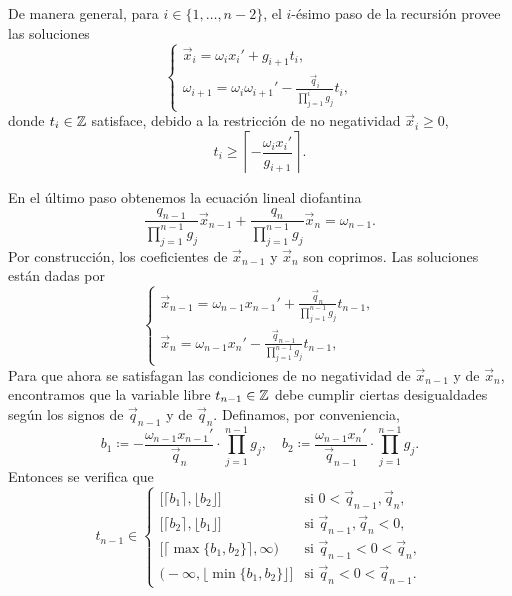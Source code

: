 De manera general, para $i \in \lbrace 1, \ldots, n - 2 \rbrace$, el $i$-ésimo paso de la recursión
provee las soluciones
\begin{equation}
	\label{eq:recurrence}
	\begin{cases}
		\vec{x}_i = \omega_ix_i' + g_{i + 1}t_i, \\
		\omega_{i + 1} = \omega_i\omega_{i + 1}' - \frac{\vec{q}_i}{\prod_{j=1}^{i}g_j}t_i,
	\end{cases}
\end{equation}
donde $t_i \in \mathbb{Z}$ satisface, debido a la restricción de no negatividad $\vec{x}_i \geq 0$,
\begin{equation}
	\label{eq:param-lb}
	t_i \geq \left\lceil -\frac{\omega_ix_i'}{g_{i + 1}} \right\rceil.
\end{equation}

En el último paso obtenemos la ecuación lineal diofantina
\begin{equation}
	\label{eq:last-equation}
	\frac{q_{n-1}}{\prod_{j=1}^{n-1}g_j}\vec{x}_{n-1} +
	\frac{q_{n}}{\prod_{j=1}^{n-1}g_j}\vec{x}_n
	= \omega_{n-1}.
\end{equation}
Por construcción, los coeficientes de $\vec{x}_{n - 1}$ y $\vec{x}_n$ son coprimos. Las soluciones
están dadas por
\begin{equation}
	\label{eq:last-solution}
	\begin{cases}
		\vec{x}_{n-1} = \omega_{n-1}x_{n-1}' + \frac{\vec{q}_n}{\prod_{j=1}^{n-1}g_j}t_{n-1}, \\
		\vec{x}_n = \omega_{n-1}x_n' - \frac{\vec{q}_{n-1}}{\prod_{j=1}^{n-1}g_j}t_{n-1},
	\end{cases}
\end{equation}
Para que ahora se satisfagan las condiciones de no negatividad de $\vec{x}_{n-1}$ y de $\vec{x}_n$,
encontramos que la variable libre $t_{n-1} \in \mathbb{Z}$ debe cumplir ciertas desigualdades según los
signos de $\vec{q}_{n-1}$ y de $\vec{q}_n$. Definamos, por conveniencia,
\begin{equation}
	\label{eq:lr-bounds}
	b_1 \coloneq -\frac{\omega_{n-1}x_{n-1}'}{\vec{q}_n} \cdot \prod_{j=1}^{n-1}g_j,
	\quad b_2 \coloneq \frac{\omega_{n-1}x_{n}'}{\vec{q}_{n-1}} \cdot \prod_{j=1}^{n-1}g_j.
\end{equation}
Entonces se verifica que
\begin{equation}
	\label{eq:feasible-param}
	t_{n-1} \in 
	\begin{cases}
		\big[ \lceil b_1 \rceil, \lfloor b_2 \rfloor \big] & \text{si } 0 < \vec{q}_{n-1}, \vec{q}_n, \\
		\big[ \lceil b_2 \rceil, \lfloor b_1 \rfloor \big] & \text{si } \vec{q}_{n-1}, \vec{q}_n < 0, \\
		\big[ \lceil \max\lbrace b_1 ,  b_2 \rbrace \rceil, \infty \big) & \text{si } \vec{q}_{n-1}
		< 0 < \vec{q}_n, \\
		\big( -\infty, \lfloor \min\lbrace b_1, b_2\rbrace \rfloor \big] & \text{si } \vec{q}_n < 0
		< \vec{q}_{n-1}.
	\end{cases}
\end{equation}

